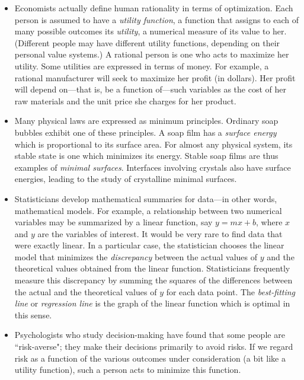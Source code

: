 \begin{itemize}
\item Economists actually define human rationality in terms of
  optimization.  Each person is assumed to have a {\em utility
    function}, a function that assigns to each of many possible
  outcomes its {\em utility}, a numerical measure of its value to her.
  (Different people may have different utility functions, depending on
  their personal value systems.)  A rational person is one who acts to
  maximize her utility.  Some utilities are expressed in terms of
  money.  For example, a rational manufacturer will seek to maximize
  her profit (in dollars).  Her profit will depend on---that is, be a
  function of---such variables as the cost of her raw materials and
  the unit price she charges for her product.

\item Many physical laws are expressed as minimum principles.
  Ordinary soap bubbles exhibit one of these principles.  A soap film
  has a {\em surface energy\/} which is proportional to its surface
  area.  For almost any physical system, its stable state is one which
  minimizes its energy.  Stable soap films are thus examples of {\em
    minimal surfaces}.  Interfaces involving crystals also have
  surface energies, leading to the study of crystalline minimal
  surfaces.

\item Statisticians develop mathematical summaries for data---in other
  words, mathematical models.  For example, a relationship between two
  numerical variables may be summarized by a linear function, say
  $y=mx+b$, where $x$ and $y$ are the variables of interest.  It would
  be very rare to find data that were exactly linear.  In a particular
  case, the statistician chooses the linear model that minimizes the
  {\em discrepancy\/} between the actual values of $y$ and the
  theoretical values obtained from the linear function.  Statisticians
  frequently measure this discrepancy by summing the squares of the
  differences between the actual and the theoretical values of $y$ for
  each data point.  The {\em best-fitting line\/} or {\em regression
    line\/} is the graph of the linear function which is optimal in
  this sense.

\item Psychologists who study decision-making have found that some
  people are ``risk-averse"; they make their decisions primarily to
  avoid risks.  If we regard risk as a function of the various
  outcomes under consideration (a bit like a utility function), such a
  person acts to minimize this function.

\end{itemize}	


